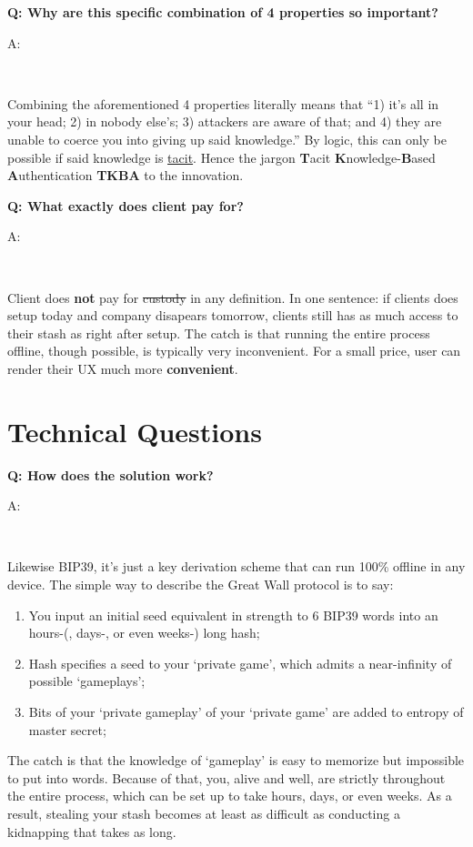 \documentclass[12pt,a4paper]{article}
\newenvironment{question}[1]{%
  \vspace{0.8em}\noindent\textbf{Q: #1}\par
  \vspace{0.2em}\noindent\begin{itshape}A:\end{itshape}~%
}{\vspace{0.8em}}
\begin{document}
\begin{question}{Why are this specific combination of 4 properties so important?}
\begin{enumerate}
 \end{enumerate}
Combining the aforementioned 4 properties literally means that ``1) it's all in your head; 2) in nobody else's; 3) attackers are aware of that; and 4) they are unable to coerce you into giving up said knowledge.'' By logic, this can only be possible if said knowledge is \href{https://en.wikipedia.org/wiki/Tacit_knowledge}{tacit}. Hence the jargon \textbf{T}acit \textbf{K}nowledge-\textbf{B}ased \textbf{A}uthentication \textbf{TKBA} to the innovation.
\end{question}

\begin{question}{What exactly does client pay for?}
Client does \textbf{not} pay for \sout{custody} in any definition. In one sentence: if clients does setup today and company disapears tomorrow, clients still has as much access to their stash as right after setup. The catch is that running the entire process offline, though possible, is typically very inconvenient. For a small price, user can render their UX much more \textbf{convenient}.
\end{question}

\section{Technical Questions}

\begin{question}{How does the solution work?}
Likewise BIP39, it's just a key derivation scheme that can run 100\% offline in any device. The simple way to describe the Great Wall protocol is to say:
\begin{enumerate}
 \item You input an initial seed equivalent in strength to 6 BIP39 words into an hours-(, days-, or even weeks-) long hash;
 \item Hash specifies a seed to your `private game', which admits a near-infinity of possible `gameplays';
 \item Bits of your `private gameplay' of your `private game' are added to entropy of master secret;
\end{enumerate}
The catch is that the knowledge of `gameplay' is easy to memorize but impossible to put into words. Because of that, you, alive and well, are strictly throughout the entire process, which can be set up to take hours, days, or even weeks. As a result, stealing your stash becomes at least as difficult as conducting a kidnapping that takes as long.
\end{question}
\end{document}
